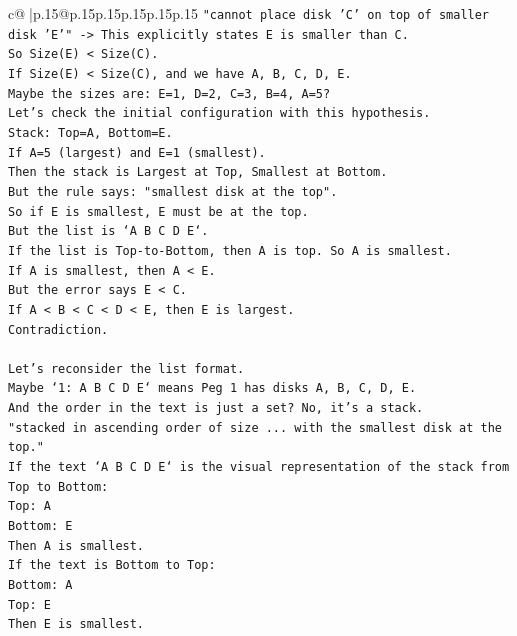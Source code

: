 \documentclass{article}
\begin{document}
{\begin{supertabular}{c@{$\;$}|p{.15\linewidth}@{}p{.15\linewidth}p{.15\linewidth}p{.15\linewidth}p{.15\linewidth}p{.15\linewidth}}
{{{\texttt{"cannot place disk 'C' on top of smaller disk 'E'" {-}> This explicitly states E is smaller than C.} \\
\texttt{So Size(E) < Size(C).} \\
\texttt{If Size(E) < Size(C), and we have A, B, C, D, E.} \\
\texttt{Maybe the sizes are: E=1, D=2, C=3, B=4, A=5?} \\
\texttt{Let's check the initial configuration with this hypothesis.} \\
\texttt{Stack: Top=A, Bottom=E.} \\
\texttt{If A=5 (largest) and E=1 (smallest).} \\
\texttt{Then the stack is Largest at Top, Smallest at Bottom.} \\
\texttt{But the rule says: "smallest disk at the top".} \\
\texttt{So if E is smallest, E must be at the top.} \\
\texttt{But the list is `A B C D E`.} \\
\texttt{If the list is Top{-}to{-}Bottom, then A is top. So A is smallest.} \\
\texttt{If A is smallest, then A < E.} \\
\texttt{But the error says E < C.} \\
\texttt{If A < B < C < D < E, then E is largest.} \\
\texttt{Contradiction.} \\
\\ 
\texttt{Let's reconsider the list format.} \\
\texttt{Maybe `1: A B C D E` means Peg 1 has disks A, B, C, D, E.} \\
\texttt{And the order in the text is just a set? No, it's a stack.} \\
\texttt{"stacked in ascending order of size ... with the smallest disk at the top."} \\
\texttt{If the text `A B C D E` is the visual representation of the stack from Top to Bottom:} \\
\texttt{Top: A} \\
\texttt{Bottom: E} \\
\texttt{Then A is smallest.} \\
\texttt{If the text is Bottom to Top:} \\
\texttt{Bottom: A} \\
\texttt{Top: E} \\
\texttt{Then E is smallest.} \\
}}}
\end{supertabular}}
\end{document}
